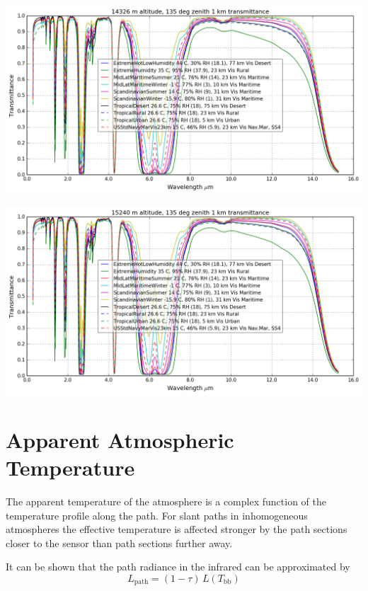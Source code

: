 \documentclass{workpackage}
\begin{document}
\begin{center}
\includegraphics{./pic/Analyse-Standard-Atmospheres_17_21.png}
\end{center}

\begin{center}
\includegraphics{./pic/Analyse-Standard-Atmospheres_17_22.png}
\end{center}


\section{Apparent Atmospheric Temperature}
\label{sec:ApparentAtmosphericTemperature}

The apparent temperature of the atmosphere is a complex function of the temperature profile along the path.  For slant paths in inhomogeneous atmospheres the effective temperature is affected stronger by the path sections closer to the sensor than path sections further away.


It can be shown that the path radiance in the infrared can be approximated by
\begin{equation}L_\textrm{path} = (1-\tau)\,L(T_\textrm{bb})\end{equation}
\end{document}
